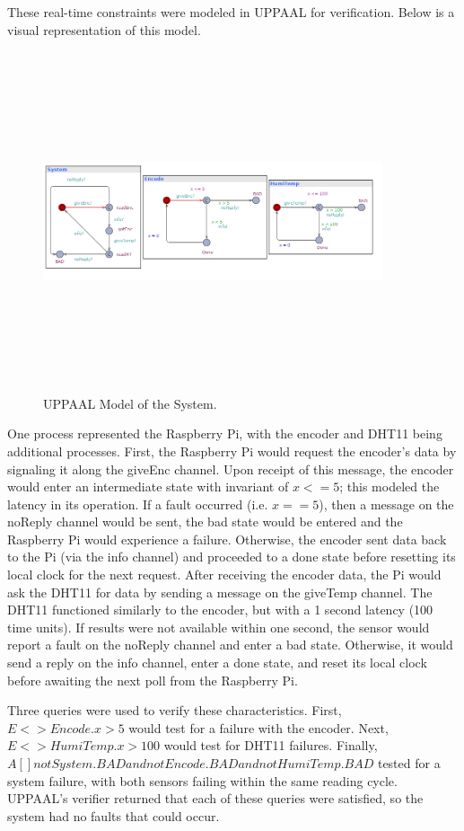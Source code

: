 \documentclass[letterpaper, 12pt]{article}
\begin{document}
\newpage
These real-time constraints were modeled in UPPAAL for verification.  Below is a visual representation of this model. 
\begin{figure}[H]
	\centering
	\includegraphics[width=10cm,height=10cm,keepaspectratio]{system.png}
	\caption[Model]{UPPAAL Model of the System.}
	\label{fig:model}
\end{figure}
\indent One process represented the Raspberry Pi, with the encoder and DHT11 being additional processes.  First, the Raspberry Pi would request the encoder's data by signaling it along the giveEnc channel.  Upon receipt of this message, the encoder would enter an intermediate state with invariant of $x <= 5$; this modeled the latency in its operation.  If a fault occurred (i.e. $x == 5$), then a message on the noReply channel would be sent, the bad state would be entered and the Raspberry Pi would experience a failure.  Otherwise, the encoder sent data back to the Pi (via the info channel) and proceeded to a done state before resetting its local clock for the next request.  After receiving the encoder data, the Pi would ask the DHT11 for data by sending a message on the giveTemp channel.  The DHT11 functioned similarly to the encoder, but with a 1 second latency (100 time units).  If results were not available within one second, the sensor would report a fault on the noReply channel and enter a bad state.  Otherwise, it would send a reply on the info channel, enter a done state, and reset its local clock before awaiting the next poll from the Raspberry Pi.

\indent Three queries were used to verify these characteristics.  First, $E <> Encode.x > 5$ would test for a failure with the encoder.  Next, $E <> HumiTemp.x > 100$ would test for DHT11 failures.  Finally, $A[] not System.BAD and not Encode.BAD and not HumiTemp.BAD$ tested for a system failure, with both sensors failing within the same reading cycle.  UPPAAL's verifier returned that each of these queries were satisfied, so the system had no faults that could occur.
\end{document}
